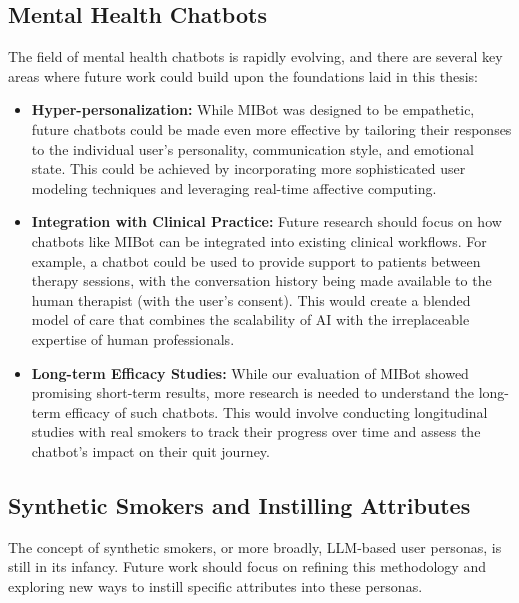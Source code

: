 \subsection{Mental Health Chatbots}

The field of mental health chatbots is rapidly evolving, and there are several key areas where future work could build upon the foundations laid in this thesis:

\begin{itemize}
    \item \textbf{Hyper-personalization:} While MIBot was designed to be empathetic, future chatbots could be made even more effective by tailoring their responses to the individual user's personality, communication style, and emotional state. This could be achieved by incorporating more sophisticated user modeling techniques and leveraging real-time affective computing.
    \item \textbf{Integration with Clinical Practice:} Future research should focus on how chatbots like MIBot can be integrated into existing clinical workflows. For example, a chatbot could be used to provide support to patients between therapy sessions, with the conversation history being made available to the human therapist (with the user's consent). This would create a blended model of care that combines the scalability of AI with the irreplaceable expertise of human professionals.
    \item \textbf{Long-term Efficacy Studies:} While our evaluation of MIBot showed promising short-term results, more research is needed to understand the long-term efficacy of such chatbots. This would involve conducting longitudinal studies with real smokers to track their progress over time and assess the chatbot's impact on their quit journey.
\end{itemize}

\subsection{Synthetic Smokers and Instilling Attributes}

The concept of synthetic smokers, or more broadly, LLM-based user personas, is still in its infancy. Future work should focus on refining this methodology and exploring new ways to instill specific attributes into these personas.

